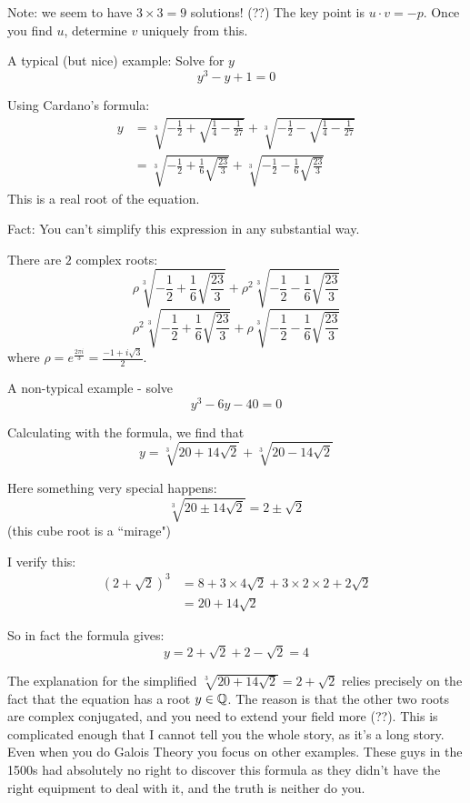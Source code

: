 \documentclass[10pt]{scrartcl}
\begin{document}
Note: we seem to have $3 \times 3 = 9$ solutions! (??) The key point is $u \cdot v = -p$. Once you find $u$, determine $v$ uniquely from this.\\

\begin{example}
A typical (but nice) example:  Solve for $y$
\[y^3 - y + 1= 0\]	

Using Cardano's formula: 
\[
\begin{aligned}
  y &= \sqrt[3]{-\frac{1}{2} + \sqrt{\frac{1}{4}- \frac{1}{27}}} +\sqrt[3]{-\frac{1}{2} - \sqrt{\frac{1}{4}- \frac{1}{27}}}\\
  &= \sqrt[3]{-\frac{1}{2} + \frac{1}{6}\sqrt{\frac{23}{3}}} + \sqrt[3]{-\frac{1}{2} - \frac{1}{6}\sqrt{\frac{23}{3}}} 
\end{aligned}
\]
This is a real root of the equation. 

Fact: You can't simplify this expression in any substantial way. 

There are $2$ complex roots: 
\[\rho\sqrt[3]{-\frac{1}{2} + \frac{1}{6}\sqrt{\frac{23}{3}}} + \rho^2\sqrt[3]{-\frac{1}{2} - \frac{1}{6}\sqrt{\frac{23}{3}}} \]
\[\rho^2\sqrt[3]{-\frac{1}{2} + \frac{1}{6}\sqrt{\frac{23}{3}}} + \rho\sqrt[3]{-\frac{1}{2} - \frac{1}{6}\sqrt{\frac{23}{3}}} \]
where $\rho = e^{\frac{2\pi i}{3}} = \frac{-1 + i\sqrt{3}}{2}$. 
\end{example}\vspace*{10pt}

\begin{example}
A non-typical example - solve
\[y^3 - 6y - 40 = 0\]	

Calculating with the formula, we find that 
\[y = \sqrt[3]{20 + 14\sqrt{2}} + \sqrt[3]{20 - 14\sqrt{2}}\]

Here something very special happens:
\[\sqrt[3]{20\pm 14\sqrt{2}} = 2 \pm \sqrt{2}\] 
(this cube root is a ``mirage")

I verify this: 
\[
\begin{aligned}
  (2 + \sqrt{2})^3 &= 8 + 3\times 4\sqrt{2} + 3 \times 2 \times 2 + 2\sqrt{2}\\
  &= 20 + 14\sqrt{2}
\end{aligned}
\]

So in fact the formula gives: 
\[y = 2 + \sqrt{2} + 2 - \sqrt{2} = 4\]

The explanation for the simplified $\sqrt[3]{20 + 14\sqrt{2}} = 2 + \sqrt{2}$ relies precisely on the fact that the equation has a root $y \in\mathbb{Q}$. The reason is that the other two roots are complex conjugated, and you need to extend your field more (??). This is complicated enough that I cannot tell you the whole story, as it's a long story. Even when you do Galois Theory you focus on other examples. These guys in the 1500s had absolutely no right to discover this formula as they didn't have the right equipment to deal with it, and the truth is neither do you.  
\end{example}\vspace*{10pt}
\end{document}
